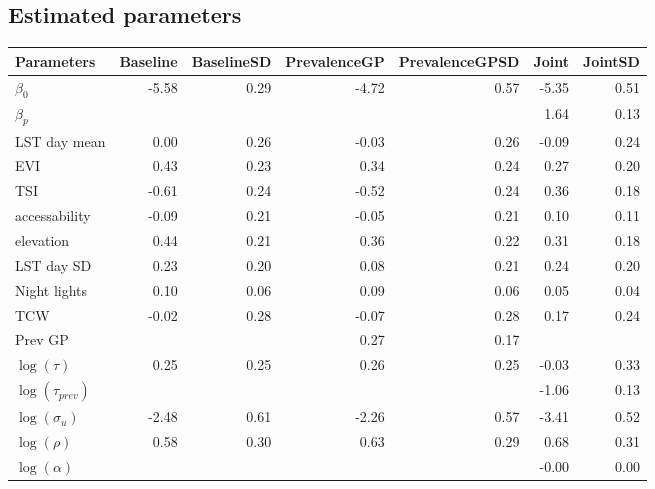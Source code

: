 \documentclass[10pt,a4]{article}
\begin{document}
\clearpage
\subsection{Estimated parameters}



\begin{table}[ht]
\centering
\begin{tabular}{lrrrrrr}
  \hline
Parameters & Baseline & BaselineSD & PrevalenceGP & PrevalenceGPSD & Joint & JointSD \\ 
  \hline
$\beta_0$ & -5.58 & 0.29 & -4.72 & 0.57 & -5.35 & 0.51 \\ 
  $\beta_p$ &  &  &  &  & 1.64 & 0.13 \\ 
  LST day mean & 0.00 & 0.26 & -0.03 & 0.26 & -0.09 & 0.24 \\ 
  EVI & 0.43 & 0.23 & 0.34 & 0.24 & 0.27 & 0.20 \\ 
  TSI & -0.61 & 0.24 & -0.52 & 0.24 & 0.36 & 0.18 \\ 
  accessability & -0.09 & 0.21 & -0.05 & 0.21 & 0.10 & 0.11 \\ 
  elevation & 0.44 & 0.21 & 0.36 & 0.22 & 0.31 & 0.18 \\ 
  LST day SD & 0.23 & 0.20 & 0.08 & 0.21 & 0.24 & 0.20 \\ 
  Night lights & 0.10 & 0.06 & 0.09 & 0.06 & 0.05 & 0.04 \\ 
  TCW & -0.02 & 0.28 & -0.07 & 0.28 & 0.17 & 0.24 \\ 
  Prev GP &  &  & 0.27 & 0.17 &  &  \\ 
  $\log(\tau)$ & 0.25 & 0.25 & 0.26 & 0.25 & -0.03 & 0.33 \\ 
  $\log(\tau_{prev})$ &  &  &  &  & -1.06 & 0.13 \\ 
  $\log(\sigma_u)$ & -2.48 & 0.61 & -2.26 & 0.57 & -3.41 & 0.52 \\ 
  $\log(\rho)$ & 0.58 & 0.30 & 0.63 & 0.29 & 0.68 & 0.31 \\ 
  $\log(\alpha)$ &  &  &  &  & -0.00 & 0.00 \\ 
   \hline
\end{tabular}
\end{table}
\end{document}
